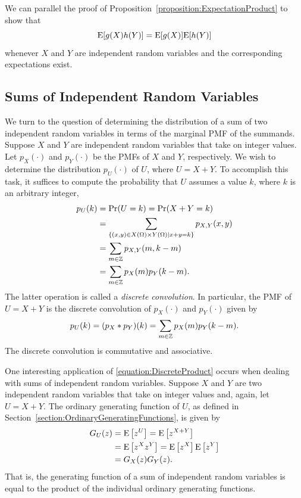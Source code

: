 We can parallel the proof of Proposition~\ref{proposition:ExpectationProduct} to show that
\begin{equation} \label{equation:DiscreteProduct}
\mathrm{E}[ g(X) h(Y) ] = \mathrm{E} [ g(X) ] \mathrm{E} [ h(Y) ]
\end{equation}
whenever $X$ and $Y$ are independent random variables and the corresponding expectations exist.


\subsection{Sums of Independent Random Variables}

We turn to the question of determining the distribution of a sum of two independent random variables in terms of the marginal PMF of the summands.
Suppose $X$ and $Y$ are independent random variables that take on integer values.
Let $p_X(\cdot)$ and $p_Y(\cdot)$ be the PMFs of $X$ and $Y$, respectively.
We wish to determine the distribution $p_U (\cdot)$ of $U$, where $U = X + Y$.
To accomplish this task, it suffices to compute the probability that $U$ assumes a value $k$, where $k$ is an arbitrary integer,
\begin{equation*}
\begin{split}
p_U (k) &= \Pr (U = k) = \Pr (X + Y = k) \\
&= \sum_{ \{ (x,y) \in X(\Omega) \times Y(\Omega) | x + y = k \} } p_{X,Y} (x, y) \\
&= \sum_{ m \in \mathbb{Z} } p_{X,Y} (m, k-m) \\
&= \sum_{ m \in \mathbb{Z} } p_X (m) p_Y(k-m) .
\end{split}
\end{equation*}
The latter operation is called a \emph{discrete convolution}. 
In particular, the PMF of $U = X + Y$ is the discrete convolution of $p_X (\cdot)$ and $p_Y (\cdot)$ given by
\begin{equation} \label{equation:DiscreteConvolution}
p_U(k) = (p_X \ast p_Y)(k)
= \sum_{m \in \mathbb{Z} } p_X(m) p_Y(k-m) .
\end{equation}
The discrete convolution is commutative and associative.

One interesting application of \eqref{equation:DiscreteProduct} occurs when dealing with sums of independent random variables.
Suppose $X$ and $Y$ are two independent random variables that take on integer values and, again, let $U = X + Y$.
The ordinary generating function of $U$, as defined in Section~\ref{section:OrdinaryGeneratingFunctions}, is given by
\begin{equation*}
\begin{split}
G_U (z) &= \mathrm{E} \left[ z^U \right]
= \mathrm{E} \left[ z^{X + Y} \right] \\
&= \mathrm{E} \left[ z^X z^Y \right]
= \mathrm{E} \left[ z^X \right] \mathrm{E} \left[ z^Y \right] \\
&= G_X(z) G_Y(z) .
\end{split}
\end{equation*}
That is, the generating function of a sum of independent random variables is equal to the product of the individual ordinary generating functions.

